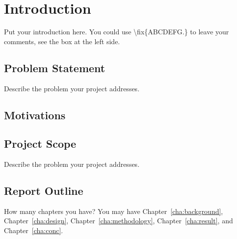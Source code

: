 \chapter{Introduction}
\label{cha:intro}

Put your introduction here. You could use \textbackslash fix\{ABCDEFG.\}
to leave your comments, see the box at the left side.



\section{Problem Statement}
\label{sec:problemstatement}
Describe the problem your project addresses.


\section{Motivations}
\label{sec:motivations}


\section{Project Scope}
\label{sec:projectscope}
Describe the problem your project addresses.


\section{Report Outline}
\label{sec:outline}

How many chapters you have? You may have Chapter~\ref{cha:background},
Chapter~\ref{cha:design}, Chapter~\ref{cha:methodology},
Chapter~\ref{cha:result}, and Chapter~\ref{cha:conc}.

